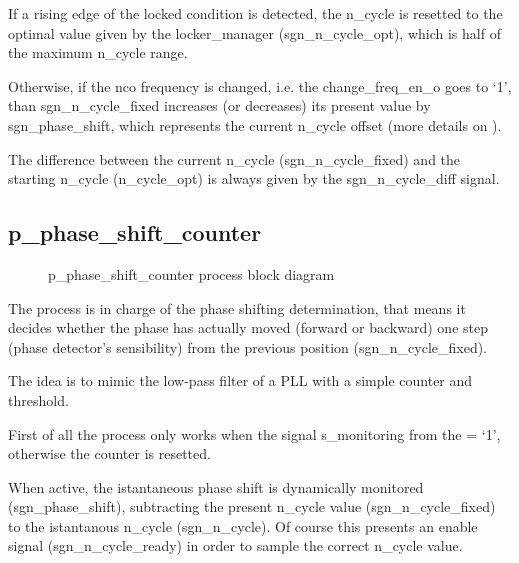 \documentclass[letterpaper,10pt,english,openany,oneside]{sphinxmanual}
\begin{document}
\begin{DUlineblock}{0em}
\item[] If a rising edge of the locked condition is detected, the n\_cycle is resetted to the optimal value given by the locker\_manager (sgn\_n\_cycle\_opt), which is half of the maximum n\_cycle range.
\item[] Otherwise, if the nco frequency is changed, i.e. the change\_freq\_en\_o goes to ‘1’, than sgn\_n\_cycle\_fixed increases (or decreases) its present value by sgn\_phase\_shift, which represents the current n\_cycle offset (more details on {\hyperref[\detokenize{code_explanation/phase_detector:p-phase-shift-counter-ref}]{}}).
\end{DUlineblock}

The difference between the current n\_cycle (sgn\_n\_cycle\_fixed) and the starting n\_cycle (n\_cycle\_opt) is always given by the sgn\_n\_cycle\_diff signal.


\subsection{p\_phase\_shift\_counter}
\label{\detokenize{code_explanation/phase_detector:p-phase-shift-counter}}\label{\detokenize{code_explanation/phase_detector:p-phase-shift-counter-ref}}
\begin{figure}[htbp]
\centering
\capstart

\noindent{}
\caption{p\_phase\_shift\_counter process block diagram}\label{\detokenize{code_explanation/phase_detector:id4}}\end{figure}

\begin{DUlineblock}{0em}
\item[] The process is in charge of the phase shifting determination, that means it decides whether the phase has actually moved (forward or backward) one step (phase detector’s sensibility) from the previous position (sgn\_n\_cycle\_fixed).
\item[] The idea is to mimic the low-pass filter of a PLL with a simple counter and threshold.
\end{DUlineblock}

\begin{DUlineblock}{0em}
\item[] First of all the process only works when the signal s\_monitoring from the {\hyperref[\detokenize{code_explanation/phase_detector:fsm-ref}]{}} = ‘1’, otherwise the counter is resetted.
\item[] When active, the istantaneous phase shift is dynamically monitored (sgn\_phase\_shift), subtracting the present n\_cycle value (sgn\_n\_cycle\_fixed) to the istantanous n\_cycle (sgn\_n\_cycle). Of course this presents an enable signal (sgn\_n\_cycle\_ready) in order to sample the correct n\_cycle value.
\end{DUlineblock}
\end{document}
